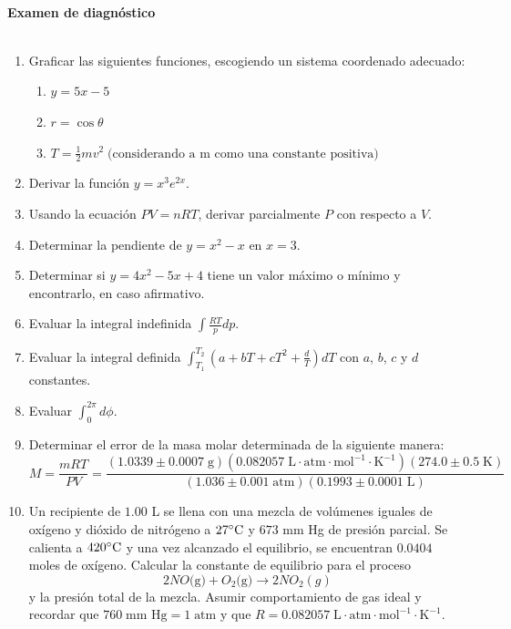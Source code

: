 \documentclass[a4paper,12pt]{article}
\begin{document}

\begin{center}
\HRule \\[0.4cm]
{ \bfseries Examen de diagn\'ostico}\\ %
\HRule \\[0.4cm]
\end{center}


\begin{enumerate}

 \item Graficar las siguientes funciones, escogiendo un sistema coordenado adecuado:
 \begin{enumerate}
  \item $y=5x-5$
  \item $r=\cos\theta$
  \item $T=\frac{1}{2}mv^2\;(\mbox{considerando a }$m$\mbox{ como una constante positiva})$
 \end{enumerate}

 \item Derivar la funci\'on $y=x^3e^{2x}$.
 \item Usando la ecuaci\'on $PV=nRT$, derivar parcialmente $P$ con respecto a $V$. 
 \item Determinar la pendiente de $y=x^2-x$ en $x=3$.
 \item Determinar si $y=4x^2-5x+4$ tiene un valor m\'aximo o m\'inimo y encontrarlo, en caso afirmativo.
 \item Evaluar la integral indefinida $\int \frac{RT}{p} dp$.
 \item Evaluar la integral definida $\int_{T_1}^{T_2}\left(a+bT+cT^2+\frac{d}{T}\right)dT$ con $a$, $b$, $c$ y $d$ constantes. 
 \item Evaluar $\int_{0}^{2\pi}d\phi$.
 \item Determinar el error de la masa molar determinada de la siguiente manera:
$$M=\frac{mRT}{PV}=\frac{(1.0339\pm 0.0007\;\text{g})(0.082057\;\text{L}\cdot\text{atm}\cdot\text{mol}^{-1}\cdot\text{K}^{-1})(274.0\pm 0.5\;\text{K})}{(1.036\pm 0.001\;\text{atm})(0.1993\pm 0.0001\;\text{L})}$$
 \item Un recipiente de $1.00$ L se llena con una mezcla de vol\'umenes iguales de ox\'igeno y di\'oxido de nitr\'ogeno a $27\celsius$ y $673$ mm Hg de presi\'on parcial. Se calienta a $420\celsius$ y una vez alcanzado el equilibrio, se encuentran $0.0404$ moles de ox\'igeno. Calcular la constante de equilibrio para el proceso
$$2NO\mbox{(g)}+O_2\mbox{(g)}\rightarrow 2NO_2{(g)}$$
y la presi\'on total de la mezcla. Asumir comportamiento de gas ideal y recordar que $760\;\mbox{mm Hg}=1\;\mbox{atm}$ y que $R=0.082057\;\text{L}\cdot\text{atm}\cdot\text{mol}^{-1}\cdot\text{K}^{-1}$. 

\end{enumerate}
 
\end{document}
